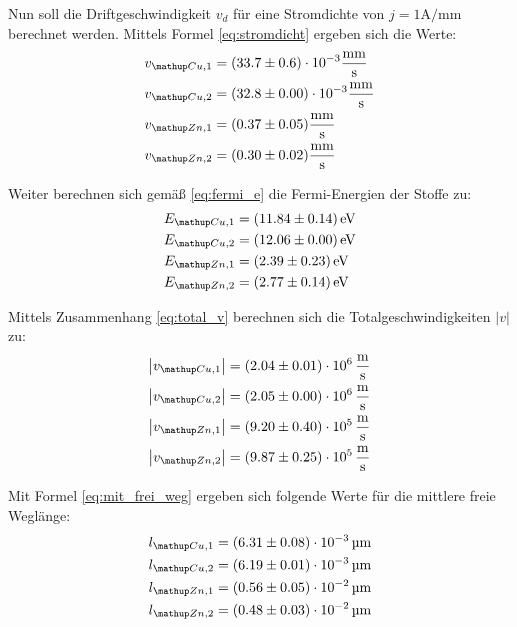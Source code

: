 Nun soll die Driftgeschwindigkeit $v_d$ für eine Stromdichte von $j = 1 \si{\ampere \per \milli \meter}$ berechnet werden. Mittels Formel
\eqref{eq:stromdicht} ergeben sich die Werte:
\begin{align}
\begin{aligned}
v\ua{Cu,1} &= (33.7 \pm 0.6)\cdot10^{-3}   \si{\milli\meter\per\second}  \\%
v\ua{Cu,2} &= (32.8 \pm 0.00)\cdot10^{-3}  \si{\milli\meter\per\second}  \\
v\ua{Zn,1} &= (0.37 \pm 0.05)   \si{\milli\meter\per\second} \\
v\ua{Zn,2} &= (0.30 \pm 0.02)   \si{\milli\meter\per\second}
\end{aligned}
\end{align}

Weiter berechnen sich gemäß \eqref{eq:fermi_e} die Fermi-Energien der Stoffe zu: %
\begin{align}
\begin{aligned}
E\ua{Cu,1} &= (11.84 \pm 0.14) \, \si{\eV}  \\%
E\ua{Cu,2} &= (12.06 \pm 0.00) \, \si{\eV}  \\
E\ua{Zn,1} &= (2.39 \pm 0.23)  \,  \si{\eV} \\
E\ua{Zn,2} &= (2.77 \pm 0.14)  \, \si{\eV}
\end{aligned}
\end{align}

Mittels Zusammenhang \eqref{eq:total_v} berechnen sich die Totalgeschwindigkeiten $\left| v \right| $ zu:
\begin{align}
\begin{aligned}
\left|v\ua{Cu,1}\right| &= (2.04 \pm 0.01)\cdot 10^6 \, \si{\meter \per \second}  \\%
\left|v\ua{Cu,2}\right| &= (2.05 \pm 0.00)\cdot 10^6 \, \si{\meter \per \second}  \\
\left|v\ua{Zn,1}\right| &= (9.20 \pm 0.40)\cdot 10^5 \, \si{\meter \per \second}  \\
\left|v\ua{Zn,2}\right| &= (9.87 \pm 0.25)\cdot 10^5 \, \si{\meter \per \second}
\end{aligned}
\end{align}

Mit Formel \eqref{eq:mit_frei_weg} ergeben sich folgende Werte für die mittlere freie Weglänge:
\begin{align}
\begin{aligned}
l\ua{Cu,1} &= (6.31 \pm 0.08)\cdot 10^{-3} \, \si{\micro\meter}  \\%
l\ua{Cu,2} &= (6.19 \pm 0.01)\cdot 10^{-3} \, \si{\micro\meter}  \\
l\ua{Zn,1} &= (0.56 \pm 0.05)\cdot 10^{-2} \, \si{\micro\meter}  \\
l\ua{Zn,2} &= (0.48 \pm 0.03)\cdot 10^{-2} \, \si{\micro\meter}
\end{aligned}
\end{align}

